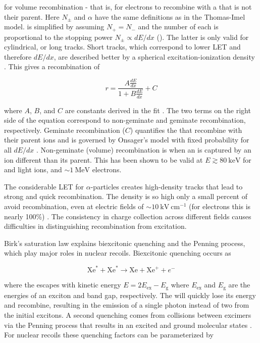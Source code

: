 \noindent for volume recombination - that is, for electrons to recombine with a  that is not their parent.  Here $N_{\pm}$ and
$\alpha$ have the same definitions as in the Thomas-Imel model.   is simplified by assuming
$N_{+} = N_{-}$ and the number of each is proportional to the stopping power $N_{\pm} \propto dE/dx$
().  The latter is only valid for
cylindrical, or long tracks.  Short tracks, which correspond to lower LET and therefore $dE/dx$, are described better by a spherical
excitation-ionization density .  This gives a recombination of

\begin{equation}
r = \frac{A \frac{dE}{dx}}{1 + B \frac{dE}{dx}} + C
\label{eq:birks_recomb}
\end{equation}

\noindent where $A$, $B$, and $C$ are constants derived in the fit .  The two terms on the right side of the equation
correspond to
non-geminate and geminate recombination, respectively.  Geminate recombination ($C$) quantifies the
\electron that recombine with their parent ions and is governed by Onsager's model with fixed probability for all $dE/dx$
.  Non-geminate
(volume) recombination is when an \electron is captured by an ion different than its parent.  This has been shown to be valid at
$E \gtrsim 80\ \mathrm{keV}$ for \gammarays and light ions, and ${\sim} 1\ \mathrm{MeV}$ electrons.

The considerable LET for $\alpha$-particles creates high-density tracks that lead to strong and quick recombination.  The
density is so high only a small percent of \electron avoid recombination, even at electric fields of
${\sim} 10\ \mathrm{kV\ cm^{-1}}$
(for electrons this is nearly 100\%) .  The consistency in charge collection across different fields causes
difficulties in distinguishing recombination from excitation.

Birk's saturation law explains biexcitonic quenching and the Penning process, which play major roles in nuclear recoils.  Biexcitonic
quenching occurs as

\begin{equation}
\mathrm{Xe}^{*} + \mathrm{Xe}^{*} \rightarrow \mathrm{Xe} + \mathrm{Xe}^{+} + e^{-}
\label{eq:biexcitonic_again}
\end{equation}

\noindent where the \electron escapes with kinetic energy $E = 2E_{\mathrm{ex}} - E_{\mathrm{g}}$ where $E_{\mathrm{ex}}$ and
$E_{\mathrm{g}}$ are the energies of an exciton and band gap, respectively.  The \electron will quickly lose its energy and recombine,
resulting in the emission of a single photon instead of two from the initial excitons.  A second quenching comes from collisions between
excimers via the Penning process that results in an excited and ground molecular states .  For nuclear recoils these
quenching factors can be parameterized by

